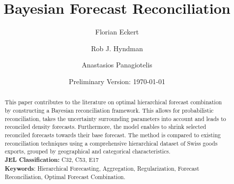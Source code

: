 


\title{\huge Bayesian Forecast Reconciliation}

\author[$\dagger$]{Florian Eckert}
\author[$\ddagger$]{Rob J. Hyndman}
\author[$\ddagger$]{Anastasios Panagiotelis}
\date{Preliminary Version: \today}

\maketitle
\begin{abstract}
This paper contributes to the literature on optimal hierarchical forecast combination by constructing a Bayesian reconciliation framework. This allows for probabilistic reconciliation, takes the uncertainty surrounding parameters into account and leads to reconciled density forecasts. Furthermore, the model enables to shrink selected reconciled forecasts towards their base forecast. The method is compared to existing reconciliation techniques using a comprehensive hierarchical dataset of Swiss goods exports, grouped by geographical and categorical characteristics.\\

\noindent \textbf{JEL Classification:} C32, C53, E17 \\
\noindent \textbf{Keywords}: Hierarchical Forecasting, Aggregation, Regularization, Forecast Reconciliation, Optimal Forecast Combination.
\end{abstract}
\clearpage




\tableofcontents

\clearpage

\listoffigures
\listoftables

\clearpage


